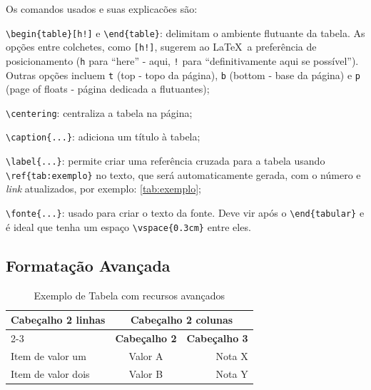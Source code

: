 Os comandos usados e suas explicacões são:
\begin{alineas}
	\item \texttt{\textbackslash begin\{table\}[h!]} e \texttt{\textbackslash end\{table\}}: delimitam o ambiente flutuante da tabela. As opções entre colchetes, como \texttt{[h!]}, sugerem ao \LaTeX\  a preferência de posicionamento (\texttt{h} para ``here'' - aqui, \texttt{!} para ``definitivamente aqui se possível''). Outras opções incluem \texttt{t} (top - topo da página), \texttt{b} (bottom - base da página) e \texttt{p} (page of floats - página dedicada a flutuantes);
	\item \texttt{\textbackslash centering}: centraliza a tabela na página;
	\item \texttt{\textbackslash caption\{...\}}: adiciona um título à tabela;
	\item \texttt{\textbackslash label\{...\}}: permite criar uma referência cruzada para a tabela usando\\ \texttt{\textbackslash ref\{tab:exemplo\}} no texto, que será automaticamente gerada, com o número e \emph{link} atualizados, por exemplo: \autoref{tab:exemplo};
	\item \texttt{\textbackslash fonte\{...\}}: usado para criar o texto da fonte. Deve vir após o \texttt{\textbackslash end\{tabular\}} e é ideal que tenha um espaço \texttt{\textbackslash vspace\{0.3cm\}} entre eles.
\end{alineas}

\subsection{Formatação Avançada}

\begin{table}
	\centering
	\caption{Exemplo de Tabela com recursos avançados}\label{tab:exemploAvan}
	\renewcommand{\arraystretch}{2.0} %
	\setlength{\tabcolsep}{2ex} %
	\begin{tabular}{m{2.5cm} c r}
		\hline
		\multirow{2}{2.5cm}{\bf Cabeçalho 2 linhas} & \multicolumn{2}{|c}{\bf Cabeçalho 2 colunas}\\
		\cline{2-3}
		& \multicolumn{1}{|c|}{\bf Cabeçalho 2} & \bf Cabeçalho 3 \\
		\hline
		Item de valor um & Valor A & Nota X \\
		Item de valor dois & Valor B & Nota Y \\
		\hline
	\end{tabular}
	
	\vspace{.3cm}
\end{table}

